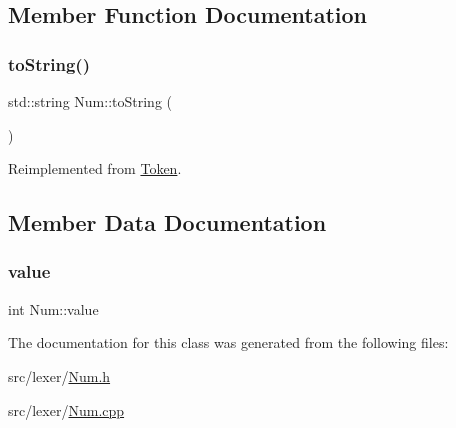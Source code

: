 \subsection{Member Function Documentation}
\mbox{\label{class_num_aec8ab507b42f2080a8cc197f45f0c935}} 
\subsubsection{\texorpdfstring{to\+String()}{toString()}}
{\footnotesize\ttfamily std\+::string Num\+::to\+String (\begin{DoxyParamCaption}{ }\end{DoxyParamCaption})\hspace{0.3cm}{\ttfamily [virtual]}}



Reimplemented from \hyperlink{class_token_a8863381edabce7bc1e92473b445ba81f}{Token}.



\subsection{Member Data Documentation}
\mbox{\label{class_num_a40cb04ca1ed295495a2e4b358b984fb8}} 
\subsubsection{\texorpdfstring{value}{value}}
{\footnotesize\ttfamily int Num\+::value}



The documentation for this class was generated from the following files\+:\begin{DoxyCompactItemize}
\item 
src/lexer/\hyperlink{_num_8h}{Num.\+h}\item 
src/lexer/\hyperlink{_num_8cpp}{Num.\+cpp}\end{DoxyCompactItemize}
